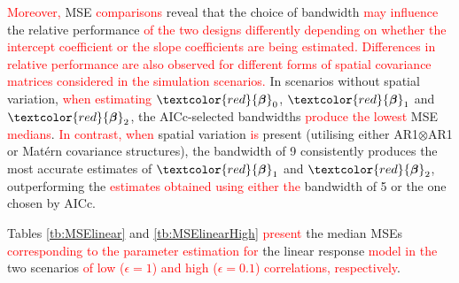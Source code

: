 \documentclass[a4paper]{article} 	%
\newcommand{\Matern}{Mat\'ern }
\newcommand{\revision}[1]{\textcolor{red}{#1}}
\newcommand{\zc}[1]{\textcolor{red}{#1}}
\begin{document}
\revision{Moreover,} MSE \zc{comparisons} reveal that the choice of bandwidth \zc{may influence} the relative performance \revision{of the two designs differently depending on whether the intercept coefficient or the slope coefficients are being estimated. Differences in relative performance are also observed for different forms of spatial covariance matrices considered in the simulation scenarios.}  In scenarios without spatial variation, \revision{when estimating} \zc{$\zc{\bm{\beta}}_0$}, $\zc{\bm{\beta}}_1$ and $\zc{\bm{\beta}}_2$, the AICc-selected bandwidths \revision{produce} \zc{the lowest} MSE \revision{medians}. \zc{In contrast, when} spatial variation \zc{is} present (utilising either AR1$\otimes$AR1 or \Matern covariance structures), the bandwidth of 9 consistently produces the most accurate estimates of $\zc{\bm{\beta}}_1$ and $\zc{\bm{\beta}}_2$, outperforming the \revision{estimates obtained using either the} bandwidth of 5 or the one chosen by AICc. %

Tables \ref{tb:MSElinear} and \ref{tb:MSElinearHigh} \revision{present} the median MSEs \revision{corresponding to the parameter estimation for} the linear response \revision{model in the} two scenarios \revision{of low ($\epsilon=1$) and high ($\epsilon= 0.1$) correlations, respectively}.
\end{document}
